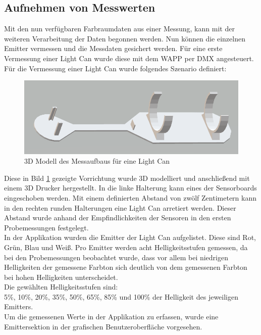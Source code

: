 \documentclass[11pt]{scrartcl}
\begin{document}
\subsection{Aufnehmen von Messwerten}
Mit den nun verfügbaren Farbraumdaten aus einer Messung, kann mit der weiteren Verarbeitung der Daten begonnen werden. Nun können die einzelnen
Emitter vermessen und die Messdaten gesichert werden. Für eine erste Vermessung einer Light Can wurde diese mit dem WAPP per DMX angesteuert.
Für die Vermessung einer Light Can wurde folgendes Szenario definiert:
\begin{figure}[H]
    \begin{center}
        \includegraphics[width=\textwidth]{images/light_can_holder_3d.png}
    \end{center}
    \caption{3D Modell des Messaufbaus für eine Light Can}\label{fig:3DCanHolder}
\end{figure}
\noindent
Diese in Bild \ref{fig:3DCanHolder} gezeigte Vorrichtung wurde 3D modelliert und anschließend mit einem 3D Drucker hergestellt. In die linke
Halterung kann eines der Sensorboards eingeschoben werden. Mit einem definierten Abstand von zwölf Zentimetern kann in den rechten runden Halterungen
eine Light Can arretiert werden. Dieser Abstand wurde anhand der Empfindlichkeiten der Sensoren in den ersten Probemessungen festgelegt.\\
In der Applikation wurden die Emitter der Light Can aufgelistet. Diese sind Rot, Grün, Blau und Weiß. Pro Emitter werden acht Helligkeitsstufen
gemessen, da bei den Probemessungen beobachtet wurde, dass vor allem bei niedrigen Helligkeiten der gemessene Farbton sich deutlich von dem
gemessenen Farbton bei hohen Helligkeiten unterscheidet.\\
Die gewählten Helligkeitsstufen sind:\\
5\%, 10\%, 20\%, 35\%, 50\%, 65\%, 85\% und 100\% der Helligkeit des jeweiligen Emitters.\\
Um die gemessenen Werte in der Applikation zu erfassen, wurde eine Emittersektion in der grafischen Benutzeroberfläche vorgesehen.
\end{document}
